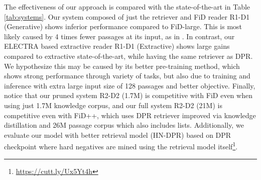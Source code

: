 \documentclass[11pt,a4paper]{article}
\begin{document}
\begin{description}[style=unboxed,leftmargin=0em,listparindent=\parindent]
\setlength\parskip{0em}
\item[Overall results.] The effectiveness of our approach is compared with the state-of-the-art in Table \ref{tab:systems}. 
Our system composed of just the retriever and FiD reader R1-D1 (Generative) shows inferior performance compared to FiD-large. 
This is most likely caused by 4 times fewer passages at its input, as in \citet{izacard2020leveraging}. 
In contrast, our ELECTRA based extractive reader R1-D1 (Extractive) shows large gains compared to extractive state-of-the-art, while having the same retriever as DPR. 
We hypothesize this may be caused by its better pre-training method, which shows strong performance through variety of tasks, but also due to training and inference with extra large input size of 128 passages and better objective. 
Finally, notice that our pruned system R2-D2 (1.7M) is competitive with FiD even when using just 1.7M knowledge corpus, and our full system R2-D2 (21M) is competitive even with FiD++, which uses DPR retriever improved via knowledge distillation and 26M passage corpus which also includes lists. 
Additionally, we evaluate our model with better retrieval model (HN-DPR) based on DPR checkpoint where hard negatives are mined using the retrieval model itself\footnote{\url{https://cutt.ly/Ux5Yt4h}}.


\end{description}
\end{document}

